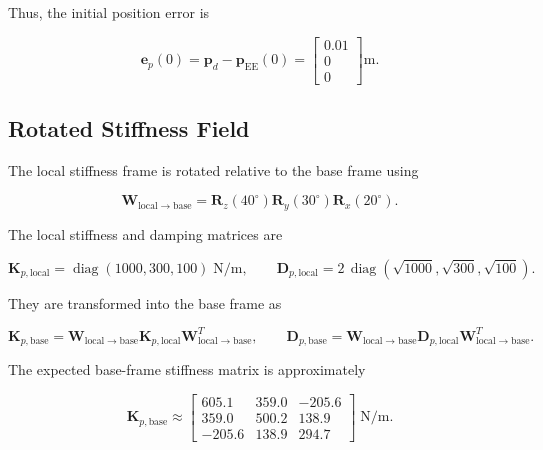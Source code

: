 Thus, the initial position error is

\begin{equation}
\label{eq:exp1_error}
\mathbf{e}_p(0)
=
\mathbf{p}_d-\mathbf{p}_{\mathrm{EE}}(0)
=
\begin{bmatrix}
0.01\\0\\0
\end{bmatrix}
\mathrm{m}.
\end{equation}

\subsection{Rotated Stiffness Field}

The local stiffness frame is rotated relative to the base frame using

\begin{equation}
\label{eq:exp1_W}
\mathbf{W}_{\mathrm{local}\rightarrow\mathrm{base}}
=
\mathbf{R}_z(40^\circ)\mathbf{R}_y(30^\circ)\mathbf{R}_x(20^\circ).
\end{equation}

The local stiffness and damping matrices are

\begin{equation}
\label{eq:exp1_KD_local}
\mathbf{K}_{p,\mathrm{local}}
=
\operatorname{diag}(1000,300,100)\;\mathrm{N/m},
\qquad
\mathbf{D}_{p,\mathrm{local}}
=
2\,\operatorname{diag}(\sqrt{1000},\sqrt{300},\sqrt{100}).
\end{equation}

They are transformed into the base frame as

\begin{equation}
\label{eq:exp1_KD_base}
\mathbf{K}_{p,\mathrm{base}}
=
\mathbf{W}_{\mathrm{local}\rightarrow\mathrm{base}}
\mathbf{K}_{p,\mathrm{local}}
\mathbf{W}_{\mathrm{local}\rightarrow\mathrm{base}}^{T},
\qquad
\mathbf{D}_{p,\mathrm{base}}
=
\mathbf{W}_{\mathrm{local}\rightarrow\mathrm{base}}
\mathbf{D}_{p,\mathrm{local}}
\mathbf{W}_{\mathrm{local}\rightarrow\mathrm{base}}^{T}.
\end{equation}

The expected base-frame stiffness matrix is approximately

\begin{equation}
\label{eq:exp1_Kbase_expected}
\mathbf{K}_{p,\mathrm{base}}
\approx
\begin{bmatrix}
605.1 & 359.0 & -205.6\\
359.0 & 500.2 & 138.9\\
-205.6 & 138.9 & 294.7
\end{bmatrix}
\;\mathrm{N/m}.
\end{equation}

